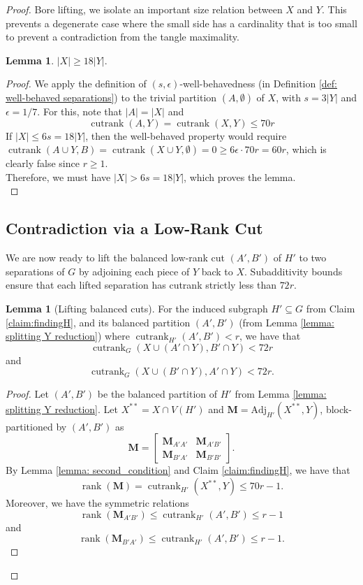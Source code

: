 \documentclass{article}
\theoremstyle{definition}
\newtheorem{lemma}[theorem]{Lemma}
\begin{document}
\begin{proof}
 Bore lifting, we isolate an important size relation between $X$ and $Y$. This prevents a degenerate case where the small side has a cardinality that is too small to prevent a contradiction from the tangle maximality.

\begin{lemma}
    $|X|\geq 18|Y|$.\label{lemma: x>18y}
\end{lemma}
\begin{proof}
    We apply the definition of $(s, \epsilon)$-well-behavedness (in Definition \ref{def: well-behaved separations}) to the trivial partition $(A, \emptyset)$ of $X$, with $s=3|Y|$ and $\epsilon=1/7$. For this, note that $|A|=|X|$ and
\[\operatorname{cutrank}(A,Y) = \operatorname{cutrank}(X,Y) \leq 70r\]
If $|X| \leq 6s = 18|Y|$, then the well-behaved property would require $\operatorname{cutrank}(A \cup Y, B) = \operatorname{cutrank}(X \cup Y, \emptyset) = 0 \geq 6\epsilon \cdot 70r = 60r$,
which is clearly false since $r \geq 1$. \\


Therefore, we must have $|X| > 6s = 18|Y|$, which proves the lemma.
    \qedhere\\
\end{proof}

\subsection{Contradiction via a Low-Rank Cut}
We are now ready to lift the balanced low‑rank cut $(A', B')$ of $H'$ to two separations of $G$ by adjoining each piece of $Y$ back to $X$. Subadditivity bounds ensure that each lifted separation has cutrank strictly less than $72r$.\\

\begin{lemma}[Lifting balanced cuts] \label{lemma:cutrank<r implies cutrank<70r}
    For the induced subgraph $H' \subseteq G$ from Claim \ref{claim:findingH}, and its balanced partition $(A',B')$ (from Lemma \ref{lemma: splitting Y reduction}) where $\operatorname{cutrank}_{H'}(A',B')<r$, we have that 
    \[\operatorname{cutrank}_G(X\cup (A' \cap  Y), B' \cap  Y) < 72r\] and \[\operatorname{cutrank}_G(X\cup (B' \cap Y), A' \cap Y) < 72r.\]
\end{lemma}

\begin{proof}
Let $(A',B')$ be the balanced partition of $H'$ from Lemma \ref{lemma: splitting Y reduction}. Let $X^{**}=X\cap V(H')$ and $\mathbf{M}=\mathrm{Adj}_{H'}(X^{**},Y)$, block-partitioned by $(A',B')$ as
\[\mathbf{M}=\begin{bmatrix}\mathbf{M}_{A'A'} & \mathbf{M}_{A'B'} \\ \mathbf{M}_{B'A'} & \mathbf{M}_{B'B'}\end{bmatrix}.
\]
By Lemma \ref{lemma: second_condition} and Claim \ref{claim:findingH}, we have that
\[\operatorname{rank}(\mathbf{M})=\operatorname{cutrank}_{H'}(X^{**},Y)\le 70r-1.
\]
Moreover, we have the symmetric relations 
\[\operatorname{rank}(\mathbf{M}_{A'B'})\le \operatorname{cutrank}_{H'}(A',B')\le r-1\] 
and
\[\operatorname{rank}(\mathbf{M}_{B'A'})\le \operatorname{cutrank}_{H'}(A',B')\le r-1.\] 


\end{proof}
\end{proof}
\end{document}
